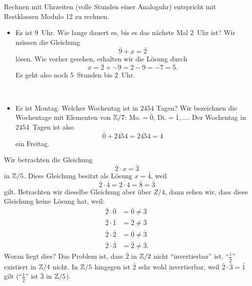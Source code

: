 \begin{bsp}
Rechnen mit Uhrzeiten (volle Stunden einer Analoguhr) entspricht mit Restklassen Modulo 12 zu rechnen.
\begin{itemize}
\item Es ist $9$~Uhr. Wie lange dauert es, bis es das nächste Mal $2$~Uhr ist? Wir müssen die Gleichung
\[
\bar 9+x=\bar2
\]
lösen. Wie vorher gesehen, erhalten wir die Lösung durch
\[
x=\bar 2+\overline{-9}=\overline{2-9}=\overline{-7}=\bar5.
\]
Es geht also noch $5$~Stunden bis $2$~Uhr.
\end{itemize}
\end{bsp}

\begin{bsp}~
\begin{itemize}
\item Es ist Montag. Welcher Wochentag ist in $2454$ Tagen? Wir bezeichnen die Wochentage mit Elementen von $\mathbb{Z}/7$: Mo.$=\bar 0$, Di.$=\bar1,\dots$. Der Wochentag in $2454$~Tagen ist also
\[
\bar0+\overline{2454}=\overline{2454}=\overline{4}
\]
ein Freitag.
\end{itemize}
\end{bsp}
\begin{rk}
Wir betrachten die Gleichung
\[
\bar 2\cdot x = \bar 3
\]
in $\mathbb{Z}/5$. Diese Gleichung besitzt als Lösung $x=\bar 4$, weil
\[
\bar 2\cdot\bar 4=\overline{2\cdot 4}=\bar 8=\bar 3
\]
gilt. Betrachten wir dieselbe Gleichung aber über $Z/4$, dann sehen wir, dass diese Gleichung keine Lösung hat, weil:
\begin{align*}
\bar 2\cdot\bar 0&=\bar 0\neq \bar 3\\
\bar 2\cdot\bar 1&=\bar 2\neq \bar 3\\
\bar 2\cdot\bar 2&=\bar 0\neq \bar 3\\
\bar 2\cdot\bar 3&=\bar 2\neq \bar 3.
\end{align*}
Woran liegt dies? Das Problem ist, dass $\bar 2$ in $\mathbb{Z}/2$ nicht ``invertierbar'' ist, ``$\frac{1}{\bar 2}$'' existiert in $\mathbb{Z}/4$ nicht. In $\mathbb{Z}/5$ hingegen ist $\bar 2$ sehr wohl invertierbar, weil $\bar 2\cdot\bar 3=\bar 1$ gilt (``$\frac{1}{\bar 2}$'' ist $\bar 3$ in $\mathbb{Z}/5$).
\end{rk}

